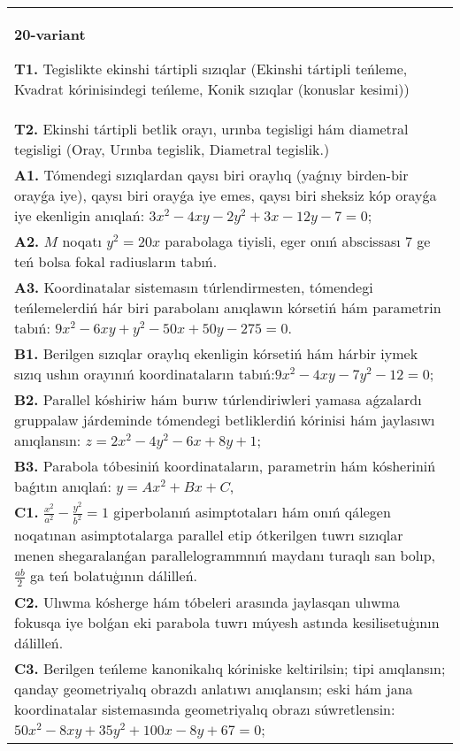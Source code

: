 \documentclass{article}
\begin{document}
\begin{tabular}{m{17cm}}
\textbf{20-variant}
\newline

\textbf{T1.} Tegislikte ekinshi tártipli sızıqlar (Ekinshi tártipli teńleme, Kvadrat kórinisindegi teńleme, Konik sızıqlar (konuslar kesimi)) \\
\textbf{T2.} Ekinshi tártipli betlik orayı, urınba tegisligi hám diametral tegisligi (Oray, Urınba tegislik, Diametral tegislik.) \\
\textbf{A1.} Tómendegi sızıqlardan qaysı biri oraylıq (yaǵnıy birden-bir orayǵa iye), qaysı biri orayǵa iye emes, qaysı biri sheksiz kóp orayǵa iye ekenligin anıqlań: $3 x^2-4 x y-2 y^2+3 x-12 y-7=0$; \\
\textbf{A2.} $M$ noqatı $y^2=20 x$ parabolaga tiyisli, eger onıń abscissası 7 ge teń bolsa fokal radiusların tabıń. \\
\textbf{A3.} Koordinatalar sistemasın túrlendirmesten, tómendegi teńlemelerdiń hár biri parabolanı anıqlawın kórsetiń hám parametrin tabıń: $9 x^2-6 x y+y^2-50 x+50 y-275=0$. \\
\textbf{B1.} Berilgen sızıqlar oraylıq ekenligin kórsetiń hám hárbir iymek sızıq ushın orayınıń koordinataların tabıń:$9 x^2-4 x y-7 y^2-12=0$; \\
\textbf{B2.} Parallel kóshiriw hám burıw túrlendiriwleri yamasa aǵzalardı gruppalaw járdeminde tómendegi betliklerdiń kórinisi hám jaylasıwı anıqlansın: $z=2 x^2-4 y^2-6 x+8 y+1$; \\
\textbf{B3.} Parabola tóbesiniń koordinataların, parametrin hám kósheriniń baǵıtın anıqlań: $y=A x^2+B x+C$, \\
\textbf{C1.} $\frac{x^2}{a^2}-\frac{y^2}{b^2}=1$ giperbolanıń asimptotaları hám onıń qálegen noqatınan asimptotalarga parallel etip ótkerilgen tuwrı sızıqlar menen shegaralanǵan parallelogrammnıń maydanı turaqlı san bolıp, $\frac{a b}{2}$ ga teń bolatuģının dálilleń. \\
\textbf{C2.} Ulıwma kósherge hám tóbeleri arasında jaylasqan ulıwma fokusqa iye bolǵan eki parabola tuwrı múyesh astında kesilisetuģının dálilleń. \\
\textbf{C3.} Berilgen teńleme kanonikalıq kóriniske keltirilsin; tipi anıqlansın; qanday geometriyalıq obrazdı anlatıwı anıqlansın; eski hám jana koordinatalar sistemasında geometriyalıq obrazı súwretlensin: $50 x^2-8 x y+35 y^2+100 x-8 y+67=0$; \\

\end{tabular}
\vspace{1cm}
\end{document}
